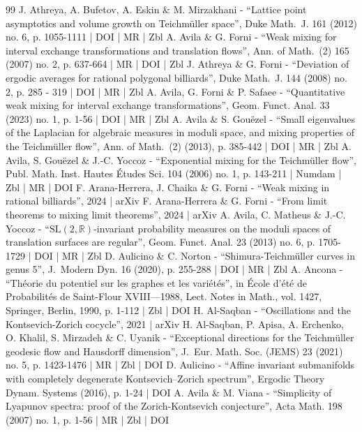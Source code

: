 \documentclass[10pt]{amsart}
\theoremstyle{plain}
\theoremstyle{definition}
\numberwithin{equation}{subsection}
\begin{document}
\begin{thebibliography}{99}
J. Athreya, A. Bufetov, A. Eskin \& M. Mirzakhani - “Lattice point asymptotics and volume growth on Teichmüller space”, Duke Math. J. 161 (2012) no. 6, p. 1055-1111 | DOI | MR | Zbl
A. Avila \& G. Forni - “Weak mixing for interval exchange transformations and translation flows”, Ann. of Math. (2) 165 (2007) no. 2, p. 637-664 | MR | DOI | Zbl
J. Athreya \& G. Forni - “Deviation of ergodic averages for rational polygonal billiards”, Duke Math. J. 144 (2008) no. 2, p. 285 - 319 | DOI | MR | Zbl
A. Avila, G. Forni \& P. Safaee - “Quantitative weak mixing for interval exchange transformations”, Geom. Funct. Anal. 33 (2023) no. 1, p. 1-56 | DOI | MR | Zbl
A. Avila \& S. Gouëzel - “Small eigenvalues of the Laplacian for algebraic measures in moduli space, and mixing properties of the Teichmüller flow”, Ann. of Math. (2) (2013), p. 385-442 | DOI | MR | Zbl
A. Avila, S. Gouëzel \& J.-C. Yoccoz - “Exponential mixing for the Teichmüller flow”, Publ. Math. Inst. Hautes Études Sci. 104 (2006) no. 1, p. 143-211 | Numdam | Zbl | MR | DOI
F. Arana-Herrera, J. Chaika \& G. Forni - “Weak mixing in rational billiards”, 2024 | arXiv
F. Arana-Herrera \& G. Forni - “From limit theorems to mixing limit theorems”, 2024 | arXiv
A. Avila, C. Matheus \& J.-C. Yoccoz - “$\mathrm{SL}(2,\mathbb{R})$-invariant probability measures on the moduli spaces of translation surfaces are regular”, Geom. Funct. Anal. 23 (2013) no. 6, p. 1705-1729 | DOI | MR | Zbl
D. Aulicino \& C. Norton - “Shimura-Teichmüller curves in genus 5”, J. Modern Dyn. 16 (2020), p. 255-288 | DOI | MR | Zbl
A. Ancona - “Théorie du potentiel sur les graphes et les variétés”, in École d’été de Probabilités de Saint-Flour XVIII—1988, Lect. Notes in Math., vol. 1427, Springer, Berlin, 1990, p. 1-112 | Zbl | DOI
H. Al-Saqban - “Oscillations and the Kontsevich-Zorich cocycle”, 2021 | arXiv
H. Al-Saqban, P. Apisa, A. Erchenko, O. Khalil, S. Mirzadeh \& C. Uyanik - “Exceptional directions for the Teichmüller geodesic flow and Hausdorff dimension”, J. Eur. Math. Soc. (JEMS) 23 (2021) no. 5, p. 1423-1476 | MR | Zbl | DOI
D. Aulicino - “Affine invariant submanifolds with completely degenerate Kontsevich–Zorich spectrum”, Ergodic Theory Dynam. Systems (2016), p. 1-24 | DOI
A. Avila \& M. Viana - “Simplicity of Lyapunov spectra: proof of the Zorich-Kontsevich conjecture”, Acta Math. 198 (2007) no. 1, p. 1-56 | MR | Zbl | DOI

\end{thebibliography}
\end{document}
